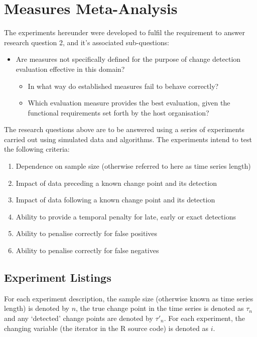 \documentclass{uvamscse}	%
\begin{document}
\section{Measures Meta-Analysis}
\label{meta analysis explainer}

The experiments hereunder were developed to fulfil the requirement to answer research question 2, and it's associated sub-questions:

\begin{itemize}
    \item Are measures not specifically defined for the purpose of change detection evaluation effective in this domain?
    \begin{itemize}
        \item In what way do established measures fail to behave correctly?
        \item Which evaluation measure provides the best evaluation, given the functional requirements set forth by the host organisation?
    \end{itemize}
\end{itemize}

The research questions above are to be answered using a series of experiments carried out using simulated data and algorithms. The experiments intend to test the following criteria:

\begin{enumerate}
    \item Dependence on sample size (otherwise referred to here as time series length)
    \item Impact of data preceding a known change point and its detection
    \item Impact of data following a known change point and its detection
    \item Ability to provide a temporal penalty for late, early or exact detections
    \item Ability to penalise correctly for false positives
    \item Ability to penalise correctly for false negatives
\end{enumerate}

\subsection{Experiment Listings}

For each experiment description, the sample size (otherwise known as time series length) is denoted by $n$, the true change point in the time series is denoted as $\tau_n$ and any `detected' change points are denoted by $\tau'_{n}$. For each experiment, the changing variable (the iterator in the \textsf{R} source code) is denoted as $i$.
\end{document}

